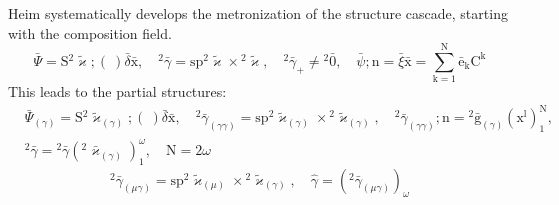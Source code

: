 \documentclass[12pt]{article}
\begin{document}
Heim systematically develops the metronization of the structure cascade, starting with the composition field.
\begin{equation}
\bar{\Psi} = \mathrm{S}{}^2\tilde{\varkappa};(\ ) \bar{\delta}\bar{\mathrm{x}}, \quad {}^2\bar{\gamma} = \mathrm{sp}{}^2\tilde{\varkappa} \times {}^2\tilde{\varkappa}, \quad {}^2\bar{\gamma}_+ \neq {}^2\bar{0}, \quad \bar{\psi};\mathrm{n} = \bar{\xi} \bar{\mathrm{x}} = \sum_{\mathrm{k}=1}^\mathrm{N} \bar{\mathrm{e}}_\mathrm{k} \mathrm{C^k} \tag{89}
\end{equation}
This leads to the partial structures:
\begin{equation}
\begin{aligned}
& \bar{\Psi}_{(\gamma)} = \mathrm{S}{}^2\tilde{\varkappa}_{(\gamma)};(\ ) \bar{\delta}\bar{\mathrm{x}}, \quad {}^2\bar{\gamma}_{(\gamma\gamma)} = \mathrm{sp}{}^2\tilde{\varkappa}_{(\gamma)} \times {}^2\tilde{\varkappa}_{(\gamma)}, \quad {}^2\bar{\gamma}_{(\gamma\gamma)};\mathrm{n} = {}^2\bar{\mathrm{g}}_{(\gamma)}(\mathrm{x^l})_1^\mathrm{N}, \\
& {}^2\bar{\gamma} = {}^2\bar{\gamma}\left({}^2\bar{\varkappa}_{(\gamma)}\right)_1^\omega, \quad \mathrm{N} = 2\omega
\end{aligned} \tag{89a}
\end{equation}
\begin{equation}
{}^2\bar{\gamma}_{(\mu\gamma)} = \mathrm{sp}{}^2\tilde{\varkappa}_{(\mu)} \times {}^2\tilde{\varkappa}_{(\gamma)}, \quad \hat{\gamma} = \left( {}^2\bar{\gamma}_{(\mu\gamma)} \right)_\omega \tag{90}
\end{equation}
\end{document}
